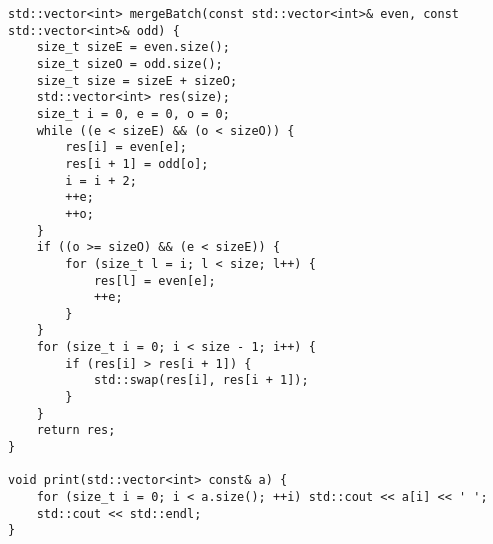 \documentclass{report}
\begin{document}
\begin{lstlisting}
std::vector<int> mergeBatch(const std::vector<int>& even, const std::vector<int>& odd) {
    size_t sizeE = even.size();
    size_t sizeO = odd.size();
    size_t size = sizeE + sizeO;
    std::vector<int> res(size);
    size_t i = 0, e = 0, o = 0;
    while ((e < sizeE) && (o < sizeO)) {
        res[i] = even[e];
        res[i + 1] = odd[o];
        i = i + 2;
        ++e;
        ++o;
    }
    if ((o >= sizeO) && (e < sizeE)) {
        for (size_t l = i; l < size; l++) {
            res[l] = even[e];
            ++e;
        }
    }
    for (size_t i = 0; i < size - 1; i++) {
        if (res[i] > res[i + 1]) {
            std::swap(res[i], res[i + 1]);
        }
    }
    return res;
}

void print(std::vector<int> const& a) {
    for (size_t i = 0; i < a.size(); ++i) std::cout << a[i] << ' ';
    std::cout << std::endl;
}

\end{lstlisting}
\end{document}
